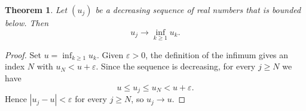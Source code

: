 \documentclass{article}
\newtheorem{theorem}{Theorem}
\begin{document}
\begin{theorem}\label{thm:monotone}
Let $(u_j)$ be a decreasing sequence of real numbers that is bounded below. Then
\[
  u_j\to \inf_{k\ge 1} u_k.
\]
\end{theorem}
\begin{proof}
Set $u=\inf_{k\ge 1}u_k$. Given $\varepsilon>0$, the definition of the infimum
gives an index $N$ with $u_N<u+\varepsilon$. Since the sequence is decreasing,
for every $j\ge N$ we have
\[
  u\le u_j\le u_N<u+\varepsilon.
\]
Hence $|u_j-u|<\varepsilon$ for every $j\ge N$, so $u_j\to u$.
\end{proof}
\end{document}
